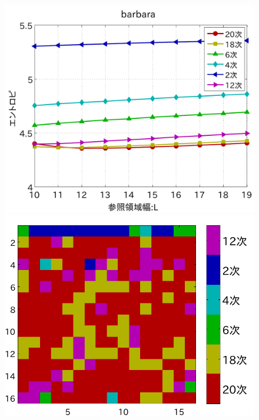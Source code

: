 \documentclass[25pt, landscape,dvipdfmx]{foils}
\begin{document}
\begin{figure}[b]
\begin{flushleft}
\includegraphics[scale=0.75]{fig/test1/barbara.pdf}\\
\vspace{3mm}
\includegraphics[angle=-90,scale=0.75]{fig/test1/b32/yosokusikino.pdf}

\end{flushleft}
\end{figure}
\end{document}
